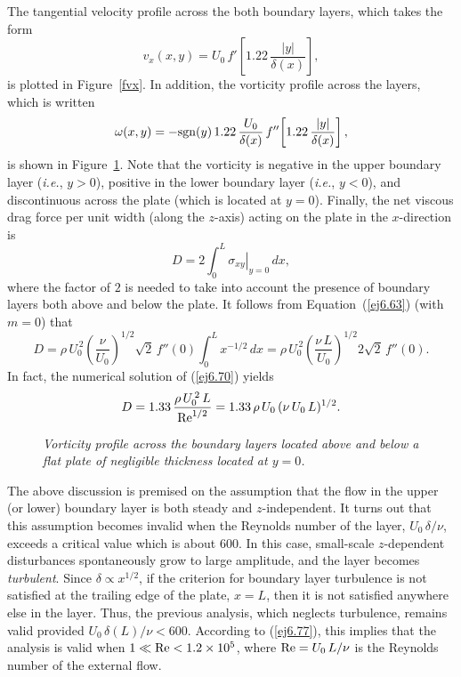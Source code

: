 The tangential velocity profile across the both boundary layers, which takes the form
\begin{equation}
v_x(x,y) = U_0\,f'\!\left[1.22\,\frac{|y|}{\delta(x)}\right],
\end{equation}
is plotted in Figure~\ref{fvx}. In addition, the vorticity profile across  the layers, which is
written
\begin{equation}
\omega(x,y) = - {\rm sgn}(y)\,1.22\,\frac{U_0}{\delta(x)}\,f''\!\left[1.22\,\frac{|y|}{\delta(x)}\right],
\end{equation}
is shown in Figure~\ref{fw}. Note that the vorticity is negative in the upper boundary layer ({\em i.e.}, $y>0$), positive
in the lower boundary layer ({\em i.e.}, $y<0$), and discontinuous across the plate (which is located at $y=0$). 
Finally, the net viscous drag force per unit width (along the $z$-axis) acting on the plate in the $x$-direction is
\begin{equation}
D = 2\int_0^L\left.\sigma_{xy}\right|_{y=0}\,dx,
\end{equation}
where the factor of $2$ is needed to take into account the presence of boundary layers both above and below the plate. 
It follows from Equation~(\ref{ej6.63}) (with $m=0$) that
\begin{equation}
D = \rho\,U_0^{\,2}\left(\frac{\nu}{U_0}\right)^{1/2}\sqrt{2}\,f''(0)\int_0^L x^{-1/2}\,dx=
\rho\,U_0^{\,2}\left(\frac{\nu\,L}{U_0}\right)^{1/2}2\sqrt{2}\,f''(0).
\end{equation}
In fact, the numerical solution of (\ref{ej6.70}) yields
\begin{equation}\label{ej6.83}
D = 1.33\,\frac{\rho\,U_0^{\,2}\,L}{{\rm Re}^{1/2}}=1.33\,\rho\,U_0\,(\nu\,U_0\,L)^{1/2}.
\end{equation}

\begin{figure}
\epsfysize=3.25in
\centerline{}
\caption{\em Vorticity profile across the boundary layers located above and below a flat plate of negligible
thickness located at $y=0$. }\label{fw}
\end{figure}

The above discussion is premised on the assumption that the flow in the upper (or lower) boundary layer is both steady and
$z$-independent. It turns out that this assumption becomes invalid when the Reynolds number of the
layer, $U_0\,\delta/\nu$, exceeds a critical value which is about $600$. In this case, small-scale $z$-dependent disturbances spontaneously grow to large amplitude, and the
layer becomes {\em turbulent}. Since $\delta\propto x^{1/2}$, if the criterion for boundary layer turbulence is not
satisfied at the trailing edge of the plate, $x=L$,  then it is not satisfied anywhere  else in the layer. Thus, the
 previous analysis, which neglects turbulence, remains valid provided  $U_0\,\delta(L)/\nu<600$.
According to (\ref{ej6.77}),  this implies that the  analysis is valid when $1\ll {\rm Re}<1.2\times 10^5$, where ${\rm Re} = U_0\,L/\nu$
is the Reynolds number of the external flow. 

